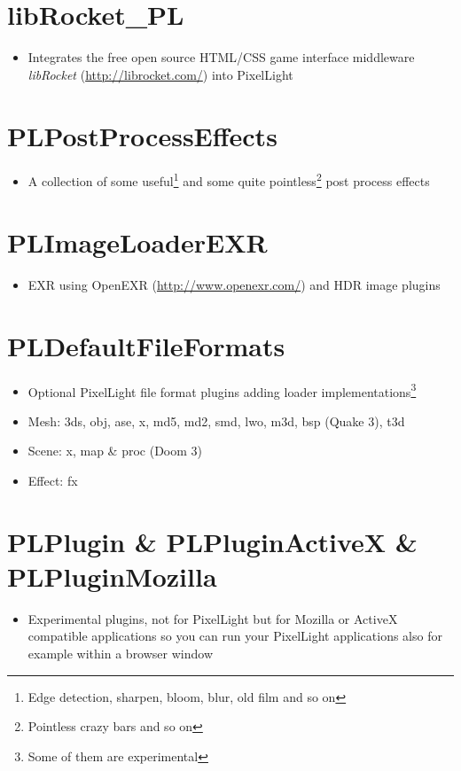 \section{libRocket\_PL}
\begin{itemize}
\item{Integrates the free open source HTML/CSS game interface middleware \emph{libRocket} (\url{http://librocket.com/}) into PixelLight}
\end{itemize}




\section{PLPostProcessEffects}
\begin{itemize}
\item{A collection of some useful\footnote{Edge detection, sharpen, bloom, blur, old film and so on} and some quite pointless\footnote{Pointless crazy bars and so on} post process effects}
\end{itemize}




\section{PLImageLoaderEXR}
\begin{itemize}
\item{EXR using OpenEXR (\url{http://www.openexr.com/}) and HDR image plugins}
\end{itemize}




\section{PLDefaultFileFormats}
\begin{itemize}
\item{Optional PixelLight file format plugins adding loader implementations\footnote{Some of them are experimental}}
\item{Mesh: 3ds, obj, ase, x, md5, md2, smd, lwo, m3d, bsp (Quake 3), t3d}
\item{Scene: x, map \& proc (Doom 3)}
\item{Effect: fx}
\end{itemize}




\section{PLPlugin \& PLPluginActiveX \& PLPluginMozilla}
\begin{itemize}
\item{Experimental plugins, not for PixelLight but for Mozilla or ActiveX compatible applications so you can run your PixelLight applications also for example within a browser window}
\end{itemize}
